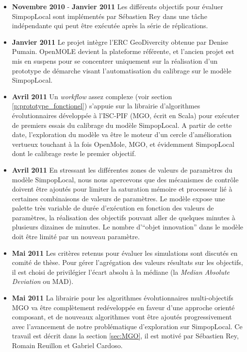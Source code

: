 \begin{itemize}[label=\textbullet]
\item {\textbf{Novembre 2010} - \textbf{Janvier 2011} } Les différents objectifs pour évaluer SimpopLocal sont implémentés par Sébastien Rey dans une tâche indépendante qui peut être exécutée après la série de réplications.

\item {\textbf{Janvier 2011}} Le projet intègre l'ERC GeoDivercity obtenue par Denise Pumain. OpenMOLE devient la plateforme référente, et l'ancien projet est mis en suspens pour se concentrer uniquement sur la réalisation d'un prototype de démarche visant l'automatisation du calibrage sur le modèle SimpopLocal.

\item {\textbf{Avril 2011}} Un \textit{workflow} assez complexe (voir section \ref{p:prototype_fonctionel}) s'appuie sur la librairie d'algorithmes évolutionnaires développée à l'ISC-PIF (MGO, écrit en Scala) pour exécuter de premiers essais du calibrage du modèle SimpopLocal. A partir de cette date, l'exploration du modèle va être le moteur d'un cercle d'amélioration vertueux touchant à la fois OpenMole, MGO, et évidemment SimpopLocal dont le calibrage reste le premier objectif.

\item {\textbf{Avril 2011}} En stressant les différentes zones de valeurs de paramètres du modèle SimpopLocal, nous nous apercevons que des mécanismes de contrôle doivent être ajoutés pour limiter la saturation mémoire et processeur lié à certaines combinaisons de valeurs de paramètres. Le modèle expose une palette très variable de durée d'exécution en fonction des valeurs de paramètres, la réalisation des objectifs pouvant aller de quelques minutes à plusieurs dizaines de minutes. Le nombre d'\enquote{objet innovation} dans le modèle doit être limité par un nouveau paramètre.

\item{\textbf{Mai 2011}} Les critères retenus pour évaluer les simulations sont discutés en comité de thèse. Pour gérer l'agrégation des valeurs résultats sur les objectifs, il est choisi de privilégier l'écart absolu à la médiane (la \textit{Median Absolute Deviation} ou MAD).

\item {\textbf{Mai 2011}} La librairie pour les algorithmes évolutionnaires multi-objectifs MGO va être complètement redéveloppée en faveur d'une approche orienté composant, et de nouveaux algorithmes vont être ajoutés progressivement avec l'avancement de notre problématique d'exploration sur SimpopLocal. Ce travail est décrit dans la section \ref{sec:MGO}, il est motivé par Sébastien Rey, Romain Reuillon et Gabriel Cardoso.


\end{itemize}
